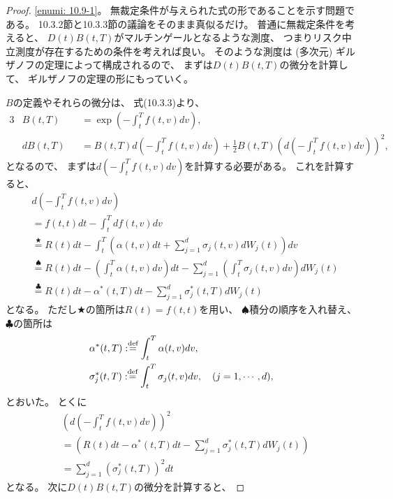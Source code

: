 \documentclass[uplatex]{jsarticle}
\theoremstyle{definition}
\def\dfn{:\overset{\mbox{{\scriptsize def}}}{=}}
\begin{document}
\begin{proof}
  \ref{enumi: 10.9-1}。
  無裁定条件が与えられた式の形であることを示す問題である。
  10.3.2節と10.3.3節の議論をそのまま真似るだけ。
  普通に無裁定条件を考えると、
  \(D(t)B(t,T)\)がマルチンゲールとなるような測度、
  つまりリスク中立測度が存在するための条件を考えれば良い。
  そのような測度は (多次元) ギルザノフの定理によって構成されるので、
  まずは\(D(t)B(t,T)\)の微分を計算して、
  ギルザノフの定理の形にもっていく。

  \(B\)の定義やそれらの微分は、
  式(10.3.3)より、
  \begin{alignat*}{3}
    &B(t,T) & &= \exp\left( -\int_t^Tf(t,v)dv\right), \\
    &dB(t,T) & &=
    B(t,T)d\left( -\int_t^Tf(t,v)dv\right)
    + \frac{1}{2}B(t,T)\left(d\left( -\int_t^Tf(t,v)dv\right)\right)^2,
  \end{alignat*}
  となるので、
  まずは\(d\left( -\int_t^Tf(t,v)dv \right)\)を計算する必要がある。
  これを計算すると、
  \begin{align*}
    &d\left( -\int_t^Tf(t,v)dv \right) \\
    &= f(t,t)dt - \int_t^Tdf(t,v)dv \\
    &\overset{\bigstar}{=} R(t)dt - \int_t^T\left( \alpha(t,v)dt
    + \sum_{j=1}^d\sigma_j(t,v)dW_j(t)\right)dv \\
    &\overset{\spadesuit}{=} R(t)dt
    - \left( \int_t^T \alpha(t,v)dv \right) dt
    - \sum_{j=1}^d\left(\int_t^T \sigma_j(t,v) dv\right) dW_j(t) \\
    &\overset{\clubsuit}{=} R(t)dt
    - \alpha^*(t,T) dt
    - \sum_{j=1}^d \sigma_j^*(t,T) dW_j(t)
  \end{align*}
  となる。
  ただし\(\bigstar\)の箇所は\(R(t)=f(t,t)\)を用い、
  \(\spadesuit\)積分の順序を入れ替え、
  \(\clubsuit\)の箇所は
  \begin{align*}
    &\alpha^*(t,T) \dfn \int_t^T \alpha(t,v)dv, \\
    &\sigma_j^*(t,T) \dfn \int_t^T \sigma_j(t,v) dv, \ \ \ (j=1,\cdots,d),
  \end{align*}
  とおいた。
  とくに
  \begin{align*}
    &\left(d\left( -\int_t^Tf(t,v)dv\right)\right)^2 \\
    &= \left( R(t)dt
    - \alpha^*(t,T) dt
    - \sum_{j=1}^d \sigma_j^*(t,T) dW_j(t)\right) \\
    &= \sum_{j=1}^d \left(\sigma_j^*(t,T)\right)^2dt
  \end{align*}
  となる。
  次に\(D(t)B(t,T)\)の微分を計算すると、

\end{proof}
\end{document}

